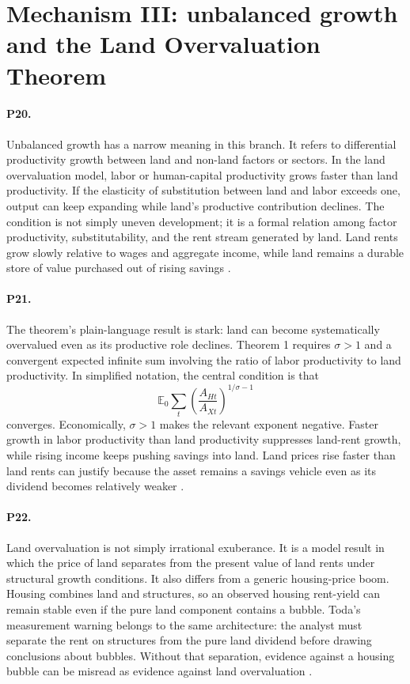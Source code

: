 \documentclass[11pt]{article}
\begin{document}
\section{Mechanism III: unbalanced growth and the Land Overvaluation Theorem}

\paragraph{P20.} Unbalanced growth has a narrow meaning in this branch. It refers to differential productivity growth between land and non-land factors or sectors. In the land overvaluation model, labor or human-capital productivity grows faster than land productivity. If the elasticity of substitution between land and labor exceeds one, output can keep expanding while land's productive contribution declines. The condition is not simply uneven development; it is a formal relation among factor productivity, substitutability, and the rent stream generated by land. Land rents grow slowly relative to wages and aggregate income, while land remains a durable store of value purchased out of rising savings \citep[pp.~1, 3--4, 13]{hiranoToda2025UnbalancedGrowth}.

\paragraph{P21.} The theorem's plain-language result is stark: land can become systematically overvalued even as its productive role declines. Theorem 1 requires \(\sigma>1\) and a convergent expected infinite sum involving the ratio of labor productivity to land productivity. In simplified notation, the central condition is that
\[
  \mathbb{E}_0\sum_t\left(\frac{A_{Ht}}{A_{Xt}}\right)^{1/\sigma-1}
\]
converges. Economically, \(\sigma>1\) makes the relevant exponent negative. Faster growth in labor productivity than land productivity suppresses land-rent growth, while rising income keeps pushing savings into land. Land prices rise faster than land rents can justify because the asset remains a savings vehicle even as its dividend becomes relatively weaker \citep[pp.~4, 13]{hiranoToda2025UnbalancedGrowth}.

\paragraph{P22.} Land overvaluation is not simply irrational exuberance. It is a model result in which the price of land separates from the present value of land rents under structural growth conditions. It also differs from a generic housing-price boom. Housing combines land and structures, so an observed housing rent-yield can remain stable even if the pure land component contains a bubble. Toda's measurement warning belongs to the same architecture: the analyst must separate the rent on structures from the pure land dividend before drawing conclusions about bubbles. Without that separation, evidence against a housing bubble can be misread as evidence against land overvaluation \citep[pp.~1--3]{toda2025LandBubbles}.
\end{document}
